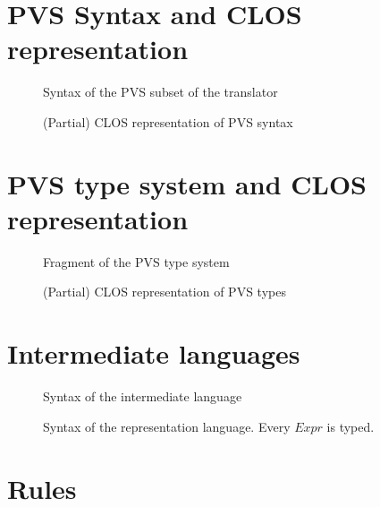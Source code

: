 \documentclass[12pt,a4paper]{article}
\begin{document}
\printbibliography

\appendix

\newpage
\section{PVS Syntax and CLOS representation}

\begin{figure}[h]

\caption{Syntax of the PVS subset of the translator}
\label{fig:PVSsyntax}
\end{figure}

\begin{figure}[!ht]

\caption{(Partial) CLOS representation of PVS syntax}
\label{fig:PVS-CLOS}
\end{figure}

\newpage
\section{PVS type system and CLOS representation}

\begin{figure}[!ht]

\caption{Fragment of the PVS type system}
\label{fig:PVS-types}
\end{figure}


\begin{figure}[!ht]

\caption{(Partial) CLOS representation of PVS types}
\label{fig:PVS-CLOS-types}
\end{figure}


\newpage
\section{Intermediate languages}

\begin{figure}[!ht]

\caption{Syntax of the intermediate language}
\label{fig:aux-syntax}
\end{figure}

\newpage
\begin{figure}[!ht]

\caption{Syntax of the representation language. Every $Expr$ is typed.}
\label{fig:Csyntax}
\end{figure}



\newpage
\section{Rules}
\label{Rules}
\end{document}
